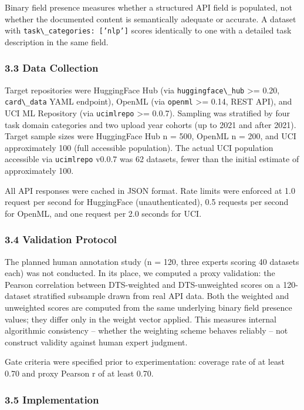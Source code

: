 Binary field presence measures whether a structured API field is populated, not whether the documented content is semantically adequate or accurate. A dataset with \texttt{task\textbackslash \_categories: ['nlp']} scores identically to one with a detailed task description in the same field.

\subsubsection{3.3 Data Collection}

Target repositories were HuggingFace Hub (via \texttt{huggingface\textbackslash \_hub} >= 0.20, \texttt{card\textbackslash \_data} YAML endpoint), OpenML (via \texttt{openml} >= 0.14, REST API), and UCI ML Repository (via \texttt{ucimlrepo} >= 0.0.7). Sampling was stratified by four task domain categories and two upload year cohorts (up to 2021 and after 2021). Target sample sizes were HuggingFace Hub n = 500, OpenML n = 200, and UCI approximately 100 (full accessible population). The actual UCI population accessible via \texttt{ucimlrepo} v0.0.7 was 62 datasets, fewer than the initial estimate of approximately 100.

All API responses were cached in JSON format. Rate limits were enforced at 1.0 request per second for HuggingFace (unauthenticated), 0.5 requests per second for OpenML, and one request per 2.0 seconds for UCI.

\subsubsection{3.4 Validation Protocol}

The planned human annotation study (n = 120, three experts scoring 40 datasets each) was not conducted. In its place, we computed a proxy validation: the Pearson correlation between DTS-weighted and DTS-unweighted scores on a 120-dataset stratified subsample drawn from real API data. Both the weighted and unweighted scores are computed from the same underlying binary field presence values; they differ only in the weight vector applied. This measures internal algorithmic consistency -- whether the weighting scheme behaves reliably -- not construct validity against human expert judgment.

Gate criteria were specified prior to experimentation: coverage rate of at least 0.70 and proxy Pearson r of at least 0.70.

\subsubsection{3.5 Implementation}

